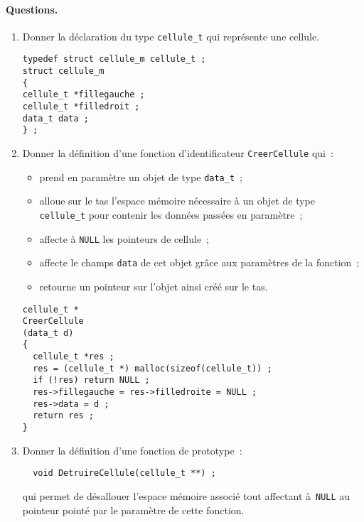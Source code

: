 \paragraph{Questions.}
\begin{enumerate}
\item Donner la d\'eclaration du type \verb+cellule_t+ qui
  repr\'esente une cellule.
\ifcorrection
\begin{correction}
\begin{verbatim}
typedef struct cellule_m cellule_t ;
struct cellule_m
{
cellule_t *fillegauche ;
cellule_t *filledroit ;
data_t data ;
} ;
\end{verbatim}
\end{correction}
\fi
\item Donner la d\'efinition d'une fonction d'identificateur
\verb+CreerCellule+ qui~:
\begin{itemize}
\item prend en param\`etre un objet de type \verb+data_t+~;
\item alloue sur le tas l'espace m\'emoire n\'ecessaire \`a un objet
  de type \verb+cellule_t+ pour contenir les donn\'ees pass\'ees en
  param\`etre~;
\item affecte \`a \verb+NULL+ les pointeurs de cellule~;
\item affecte le champs \verb+data+ de cet objet gr\^ace
  aux param\`etres de la fonction~;
\item retourne un pointeur sur l'objet ainsi cr\'e\'e sur le tas.
\end{itemize}
\ifcorrection
\begin{correction}
\begin{verbatim}
cellule_t *
CreerCellule
(data_t d)
{
  cellule_t *res ;
  res = (cellule_t *) malloc(sizeof(cellule_t)) ;
  if (!res) return NULL ;
  res->fillegauche = res->filledroite = NULL ;
  res->data = d ;
  return res ;
}
\end{verbatim}
\end{correction}
\fi
\item Donner la d\'efinition d'une fonction de prototype~:
\begin{verbatim}
  void DetruireCellule(cellule_t **) ;
\end{verbatim}
qui permet de d\'esallouer l'espace m\'emoire associ\'e tout affectant \`a~\verb+NULL+ au pointeur point\'e par le param\`etre de cette fonction.
\ifcorrection
\begin{correction}
\begin{verbatim}

\end{verbatim}
\end{correction}
\end{enumerate}
